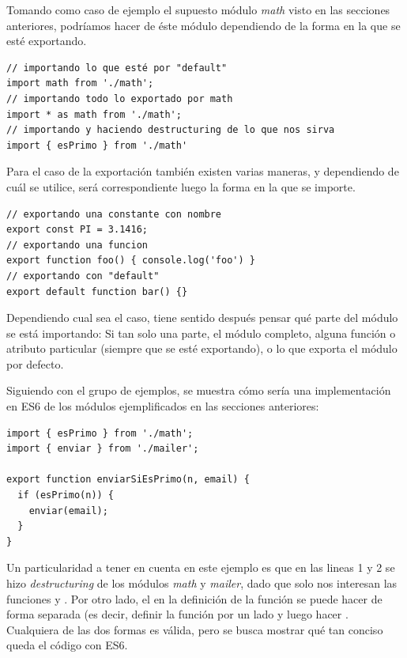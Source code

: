 Tomando como caso de ejemplo el supuesto módulo \textit{math} visto en las secciones anteriores, podríamos hacer  de éste módulo dependiendo de la forma en la que se esté exportando.

\begin{lstlisting}[title={Algunos ejemplos de \code{import}}]
// importando lo que esté por "default" 
import math from './math';
// importando todo lo exportado por math
import * as math from './math';
// importando y haciendo destructuring de lo que nos sirva
import { esPrimo } from './math'
\end{lstlisting}

Para el caso de la exportación también existen varias maneras, y dependiendo de cuál se utilice, será correspondiente luego la forma en la que se importe.

\begin{lstlisting}[title={Algunos ejemplos de \code{export}}]
// exportando una constante con nombre
export const PI = 3.1416;
// exportando una funcion
export function foo() { console.log('foo') }
// exportando con "default"
export default function bar() {}
\end{lstlisting}

Dependiendo cual sea el caso, tiene sentido después pensar qué parte del módulo se está importando: Si tan solo una parte, el módulo completo, alguna función o atributo particular (siempre que se esté exportando), o lo que exporta el módulo por defecto.

Siguiendo con el grupo de ejemplos, se muestra cómo sería una implementación en ES6 de los módulos ejemplificados en las secciones anteriores:

\begin{lstlisting}[title={Ejemplo de módulo en ES6}]
import { esPrimo } from './math';
import { enviar } from './mailer';

export function enviarSiEsPrimo(n, email) {
  if (esPrimo(n)) {
    enviar(email);
  }
}
\end{lstlisting}

Un particularidad a tener en cuenta en este ejemplo es que en las lineas 1 y 2 se hizo \textit{destructuring} de los módulos \textit{math} y \textit{mailer}, dado que solo nos interesan las funciones  y . Por otro lado, el  en la definición de la función se puede hacer de forma separada (es decir, definir la función por un lado y luego hacer . Cualquiera de las dos formas es válida, pero se busca mostrar qué tan conciso queda el código con ES6.


